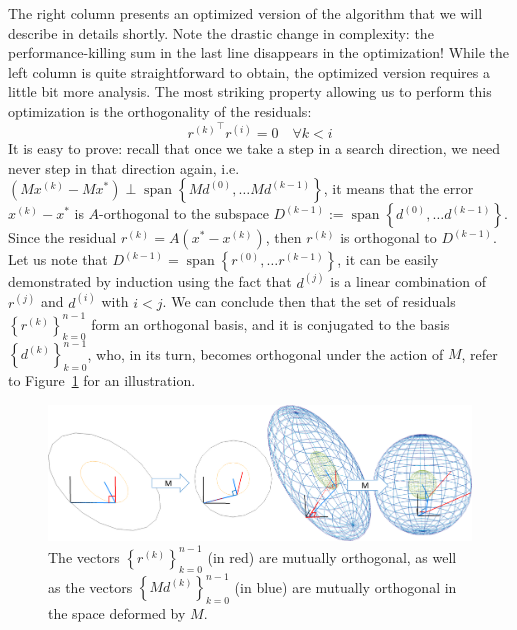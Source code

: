 \documentclass[notitlepage,oneside]{book}
\DeclareMathOperator{\Span}{span}
\begin{document}
The right column presents an optimized version of the algorithm that we will describe in details shortly.
Note the drastic change in complexity: the performance-killing sum in the last line disappears in the optimization!
While the left column is quite straightforward to obtain, the optimized version requires a little bit more analysis.
The most striking property allowing us to perform this optimization is the orthogonality of the residuals:
$$
\boxed{{r^{(k)}}^\top r^{(i)}=0 \quad \forall k<i}
$$
It is easy to prove: recall that once we take a step in a search direction, we need never step in that direction again, i.e.
$\left(Mx^{(k)} - Mx^*\right) \perp \Span\left\{Md^{(0)}, \dots Md^{(k-1)}\right\}$, it means that the error $x^{(k)} - x^*$ is $A$-orthogonal to the subspace $D^{(k-1)}:=\Span\left\{d^{(0)}, \dots d^{(k-1)}\right\}$.
Since the residual $r^{(k)} = A\left(x^*-x^{(k)}\right)$, then $r^{(k)}$ is orthogonal to $D^{(k-1)}$.
Let us note that $D^{(k-1)} = \Span\left\{r^{(0)}, \dots r^{(k-1)}\right\}$, it can be easily demonstrated by induction using the fact that $d^{(j)}$ is
a linear combination of $r^{(j)}$ and $d^{(i)}$ with $i<j$.
We can conclude then that the set of residuals $\left\{r^{(k)}\right\}_{k=0}^{n-1}$ form an orthogonal basis,
and it is conjugated to the basis $\left\{d^{(k)}\right\}_{k=0}^{n-1}$, who, in its turn, becomes orthogonal under the action of $M$, refer to Figure~\ref{fig:conjuge} for an illustration.

\begin{figure}[t]
  \centering
  \includegraphics[width=1\linewidth]{cg/conjuge.png}
  \caption{The vectors $\left\{r^{(k)}\right\}_{k=0}^{n-1}$ (in red) are mutually orthogonal, as well as
  the vectors $\left\{Md^{(k)}\right\}_{k=0}^{n-1}$ (in blue) are mutually orthogonal in the space deformed by $M$.}
  \label{fig:conjuge}
\end{figure}
\end{document}
